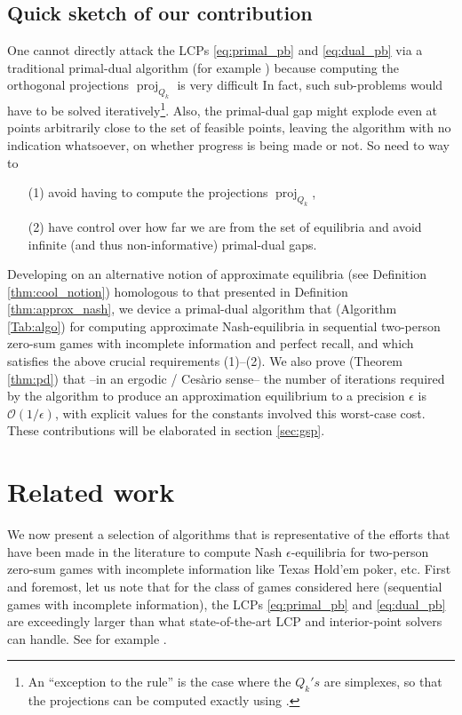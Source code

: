 \documentclass[a4paper,9pt]{extarticle}
\DeclareMathOperator{\proj}{proj}
\begin{document}
\subsection{Quick sketch of our contribution}
One cannot directly attack the LCPs \eqref{eq:primal_pb} and
\eqref{eq:dual_pb} via a traditional primal-dual algorithm
(for example \cite{chambolle2010,chambolle2014ergodic}) because
computing the orthogonal projections $\proj_{Q_k}$ is very difficult
In fact, such sub-problems would have to be solved
iteratively\footnote{An ``exception to the rule'' is the case where
  the $Q_k's$ are simplexes, so that the projections can be computed
  exactly using \cite{duchi2008efficient}.}. Also,
the primal-dual gap might explode even at points arbitrarily close to
the set of feasible points, leaving the algorithm with no indication
whatsoever, on whether progress is being made or not. So need to way to
\begin{itemize}
\item[(1)] avoid having to compute the projections $\proj_{Q_k}$,
\item[(2)] have control over how far we are from the set of
  equilibria and avoid infinite (and thus non-informative) primal-dual
  gaps.
\end{itemize}

Developing on an alternative notion of approximate equilibria (see
Definition \ref{thm:cool_notion})
homologous to that presented in Definition \ref{thm:approx_nash}, we
device a primal-dual algorithm that (Algorithm \ref{Tab:algo}) for
computing approximate Nash-equilibria in sequential two-person
zero-sum games with incomplete information and perfect recall, and
which satisfies the above crucial requirements (1)--(2). We also
prove (Theorem \ref{thm:pd}) that --in an ergodic / Ces\`ario sense-- the number of
iterations required by the algorithm to produce an approximation
equilibrium to a precision $\epsilon$ is $\mathcal{O}(1/\epsilon)$,
with explicit values for the constants involved this worst-case cost.
These contributions will be elaborated in section \ref{sec:gsp}.


\section{Related work}
\label{sec:related_work}
We now present a selection of algorithms that is representative of the
efforts that have been made in the literature to compute Nash
$\epsilon$-equilibria for two-person zero-sum games with incomplete
information like Texas Hold'em poker, etc.
First and foremost, let us note that for the class of games considered
here (sequential games with incomplete information), the LCPs
\eqref{eq:primal_pb} and \eqref{eq:dual_pb} are exceedingly larger
than what state-of-the-art LCP and interior-point solvers can
handle. See for example \cite{hoda2010smoothing,gilpinfirst}.
\end{document}
